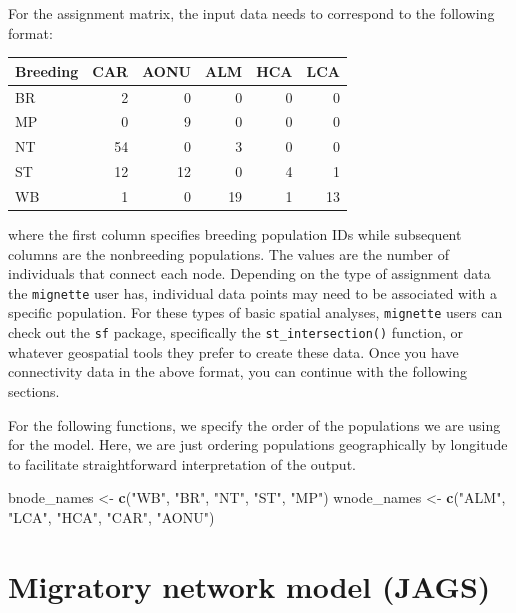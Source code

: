 \documentclass[
]{book}
\newenvironment{Shaded}{\begin{snugshade}}{\end{snugshade}}
\newcommand{\FunctionTok}[1]{\textcolor[rgb]{0.13,0.29,0.53}{\textbf{#1}}}
\newcommand{\NormalTok}[1]{#1}
\newcommand{\OtherTok}[1]{\textcolor[rgb]{0.56,0.35,0.01}{#1}}
\newcommand{\StringTok}[1]{\textcolor[rgb]{0.31,0.60,0.02}{#1}}
\begin{document}
For the assignment matrix, the input data needs to correspond to the following format:

\begin{tabular}{l|r|r|r|r|r}
\hline
Breeding & CAR & AONU & ALM & HCA & LCA\\
\hline
BR & 2 & 0 & 0 & 0 & 0\\
\hline
MP & 0 & 9 & 0 & 0 & 0\\
\hline
NT & 54 & 0 & 3 & 0 & 0\\
\hline
ST & 12 & 12 & 0 & 4 & 1\\
\hline
WB & 1 & 0 & 19 & 1 & 13\\
\hline
\end{tabular}

where the first column specifies breeding population IDs while subsequent columns are the nonbreeding populations. The values are the number of individuals that connect each node. Depending on the type of assignment data the \texttt{mignette} user has, individual data points may need to be associated with a specific population. For these types of basic spatial analyses, \texttt{mignette} users can check out the \texttt{sf} package, specifically the \texttt{st\_intersection()} function, or whatever geospatial tools they prefer to create these data. Once you have connectivity data in the above format, you can continue with the following sections.

For the following functions, we specify the order of the populations we are using for the model. Here, we are just ordering populations geographically by longitude to facilitate straightforward interpretation of the output.

\begin{Shaded}
\begin{Highlighting}[]
\NormalTok{bnode\_names }\OtherTok{\textless{}{-}} \FunctionTok{c}\NormalTok{(}\StringTok{"WB"}\NormalTok{, }\StringTok{"BR"}\NormalTok{, }\StringTok{"NT"}\NormalTok{, }\StringTok{"ST"}\NormalTok{, }\StringTok{"MP"}\NormalTok{)}
\NormalTok{wnode\_names }\OtherTok{\textless{}{-}} \FunctionTok{c}\NormalTok{(}\StringTok{"ALM"}\NormalTok{, }\StringTok{"LCA"}\NormalTok{, }\StringTok{"HCA"}\NormalTok{, }\StringTok{"CAR"}\NormalTok{, }\StringTok{"AONU"}\NormalTok{)}
\end{Highlighting}
\end{Shaded}

\hypertarget{migratory-network-model-jags}{%
\section{Migratory network model (JAGS)}\label{migratory-network-model-jags}}
\end{document}
